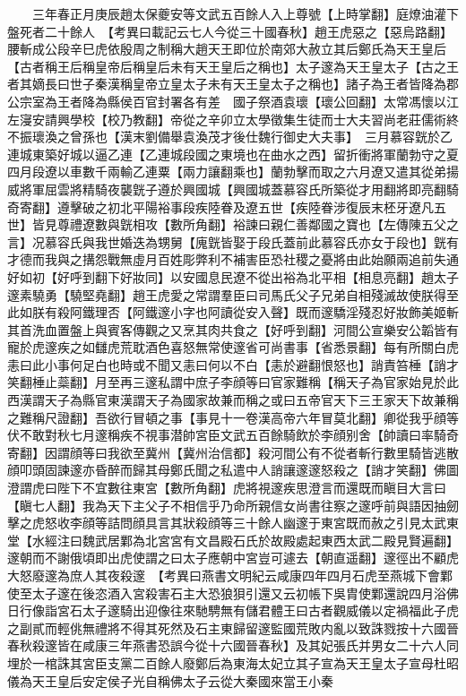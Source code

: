 　　三年春正月庚辰趙太保夔安等文武五百餘人入上尊號【上時掌翻】庭燎油灌下盤死者二十餘人　【考異曰載記云七人今從三十國春秋】趙王虎惡之【惡烏路翻】腰斬成公段辛巳虎依殷周之制稱大趙天王即位於南郊大赦立其后鄭氏為天王皇后【古者稱王后稱皇帝后稱皇后未有天王皇后之稱也】太子邃為天王皇太子【古之王者其嫡長曰世子秦漢稱皇帝立皇太子未有天王皇太子之稱也】諸子為王者皆降為郡公宗室為王者降為縣侯百官封署各有差　國子祭酒袁瓌【瓌公回翻】太常馮懷以江左寖安請興學校【校乃教翻】帝從之辛卯立太學徵集生徒而士大夫習尚老莊儒術終不振瓌渙之曾孫也【漢末劉備舉袁渙茂才後仕魏行御史大夫事】　三月慕容皝於乙連城東築好城以逼乙連【乙連城段國之東境也在曲水之西】留折衝將軍蘭勃守之夏四月段遼以車數千兩輸乙連粟【兩力讓翻乘也】蘭勃擊而取之六月遼又遣其從弟揚威將軍屈雲將精騎夜襲皝子遵於興國城【興國城蓋慕容氏所築從才用翻將即亮翻騎奇寄翻】遵擊破之初北平陽裕事段疾陸眷及遼五世【疾陸眷涉復辰末柸牙遼凡五世】皆見尊禮遼數與皝相攻【數所角翻】裕諫曰親仁善鄰國之寶也【左傳陳五父之言】况慕容氏與我世婚迭為甥舅【廆皝皆娶于段氏蓋前此慕容氏亦女于段也】皝有才德而我與之搆怨戰無虛月百姓彫弊利不補害臣恐社稷之憂將由此始願兩追前失通好如初【好呼到翻下好妝同】以安國息民遼不從出裕為北平相【相息亮翻】趙太子邃素驍勇【驍堅堯翻】趙王虎愛之常謂羣臣曰司馬氏父子兄弟自相殘滅故使朕得至此如朕有殺阿鐵理否【阿鐵邃小字也阿讀從安入聲】既而邃驕淫殘忍好妝飾美姬斬其首洗血置盤上與賓客傳觀之又烹其肉共食之【好呼到翻】河間公宣樂安公韜皆有寵於虎邃疾之如讎虎荒耽酒色喜怒無常使邃省可尚書事【省悉景翻】每有所關白虎恚曰此小事何足白也時或不聞又恚曰何以不白【恚於避翻恨怒也】誚責笞棰【誚才笑翻棰止蘂翻】月至再三邃私謂中庶子李顔等曰官家難稱【稱天子為官家始見於此西漢謂天子為縣官東漢謂天子為國家故兼而稱之或曰五帝官天下三王家天下故兼稱之難稱尺證翻】吾欲行冒頓之事【事見十一卷漢高帝六年冒莫北翻】卿從我乎顔等伏不敢對秋七月邃稱疾不視事潜帥宮臣文武五百餘騎飲於李顔别舍【帥讀曰率騎奇寄翻】因謂顔等曰我欲至冀州【冀州治信都】殺河間公有不從者斬行數里騎皆逃散顔叩頭固諫邃亦昏醉而歸其母鄭氏聞之私遣中人誚讓邃邃怒殺之【誚才笑翻】佛圖澄謂虎曰陛下不宜數往東宮【數所角翻】虎將視邃疾思澄言而還既而瞋目大言曰【瞋七人翻】我為天下主父子不相信乎乃命所親信女尚書往察之邃呼前與語因抽劒擊之虎怒收李顔等詰問顔具言其狀殺顔等三十餘人幽邃于東宮既而赦之引見太武東堂【水經注曰魏武居鄴為北宮宮有文昌殿石氏於故殿處起東西太武二殿見賢遍翻】邃朝而不謝俄頃即出虎使謂之曰太子應朝中宮豈可遽去【朝直遥翻】邃徑出不顧虎大怒廢邃為庶人其夜殺邃　【考異曰燕書文明紀云咸康四年四月石虎至燕城下會鄴使至太子邃在後恣酒入宮殺害石主大恐狼狽引還又云初帳下吳胄使鄴還說四月浴佛日行像詣宮石太子邃騎出迎像往來馳騁無有儲君體王曰古者觀威儀以定禍福此子虎之副貳而輕佻無禮將不得其死然及石主東歸留邃監國荒敗内亂以致誅戮按十六國晉春秋殺邃皆在咸康三年燕書恐誤今從十六國晉春秋】及其妃張氏并男女二十六人同埋於一棺誅其宮臣支黨二百餘人廢鄭后為東海太妃立其子宣為天王皇太子宣母杜昭儀為天王皇后安定侯子光自稱佛太子云從大秦國來當王小秦

